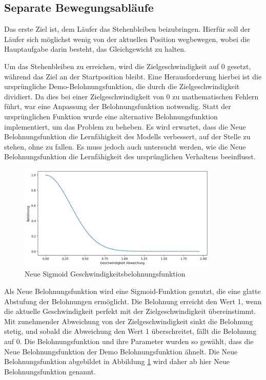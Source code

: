 \subsection{Separate Bewegungsabläufe}

Das erste Ziel ist, dem Läufer das Stehenbleiben beizubringen. Hierfür soll der Läufer sich möglichst wenig von der aktuellen Position wegbewegen, wobei die Hauptaufgabe darin besteht, das Gleichgewicht zu halten.

Um das Stehenbleiben zu erreichen, wird die Zielgeschwindigkeit auf 0 gesetzt, während das Ziel an der Startposition bleibt. Eine Herausforderung hierbei ist die ursprüngliche Demo-Belohnungsfunktion, die durch die Zielgeschwindigkeit dividiert. Da dies bei einer Zielgeschwindigkeit von 0 zu mathematischen Fehlern führt, war eine Anpassung der Belohnungsfunktion notwendig. Statt der ursprünglichen Funktion wurde eine alternative Belohnungsfunktion implementiert, um das Problem zu beheben. Es wird erwartet, dass die Neue Belohnungsfunktion die Lernfähigkeit des Modells verbessert, auf der Stelle zu stehen, ohne zu fallen. Es muss jedoch auch untersucht werden, wie die Neue Belohnungsfunktion die Lernfähigkeit des ursprünglichen Verhaltens beeinflusst.

\begin{figure}[H]
  \centering  
  \includegraphics[width=0.85\textwidth]{img/plot_vel_reward_neu}
  \caption{Neue Sigmoid Geschwindigkeitsbelohnungsfunktion}
  \label{fig:plot_vel_reward_neu}
\end{figure}

Als Neue Belohnungsfunktion wird eine Sigmoid-Funktion genutzt, die eine glatte Abstufung der Belohnungen ermöglicht. Die Belohnung erreicht den Wert 1, wenn die aktuelle Geschwindigkeit perfekt mit der Zielgeschwindigkeit übereinstimmt. Mit zunehmender Abweichung von der Zielgeschwindigkeit sinkt die Belohnung stetig, und sobald die Abweichung den Wert 1 überschreitet, fällt die Belohnung auf 0. Die Belohnungsfunktion und ihre Parameter wurden so gewählt, dass die Neue Belohnungsfunktion der Demo Belohnungsfunktion ähnelt. Die Neue Belohnungsfunktion abgebildet in Abbildung \ref{fig:plot_vel_reward_neu} wird daher ab hier Neue Belohnungsfunktion genannt.

